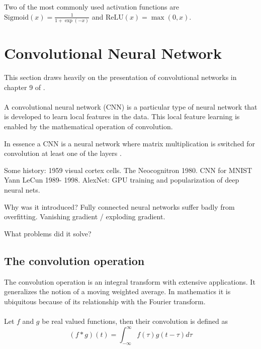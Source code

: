 \documentclass[../../thesis.tex]{subfiles}
\begin{document}
Two of the most commonly used activation functions are $\text{Sigmoid}(x) = \tfrac{1}{1+\exp(-x)}$ and $\text{ReLU}(x) = \max(0,x)$.  




\section{Convolutional Neural Network}
This section draws heavily on the presentation of convolutional networks in chapter 9 of \cite{deeplearningbook}.\\\\

A convolutional neural network (CNN) is a particular type of neural network that is developed to learn local features in the data. This local feature learning is enabled by the mathematical operation of convolution. 

In essence a CNN is a neural network where matrix multiplication is switched for convolution at least one of the layers \cite{deeplearningbook}. 

Some history: 1959 visual cortex cells. The Neocognitron 1980. CNN for MNIST Yann LeCun 1989- 1998. AlexNet: GPU training and popularization of deep neural nets.

Why was it introduced? 
Fully connected neural networks suffer badly from overfitting. Vanishing gradient / exploding gradient.

What problems did it solve?

\subsection{The convolution operation}

The convolution operation is an integral transform with extensive applications. It generalizes the notion of a moving weighted average. In mathematics it is ubiquitous because of its relationship with the Fourier transform.
\\\\
Let $f$ and $g$ be real valued functions, then their convolution is defined as
\begin{equation}
    (f*g)(t) = \int_{-\infty}^{\infty} f(\tau)g(t-\tau) d\tau
\end{equation}
\end{document}

